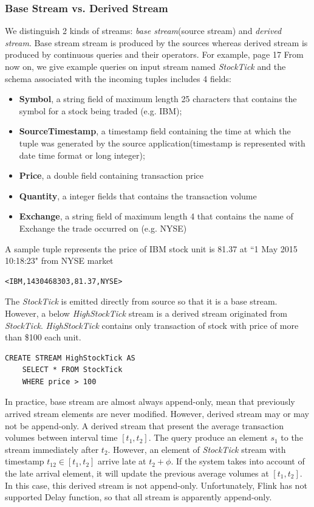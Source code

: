 \subsubsection*{Base Stream vs. Derived Stream}
We distinguish 2 kinds of streams: \textit{base stream}(source stream) and \textit{derived stream}. Base stream stream is produced by the sources whereas derived stream is produced by continuous queries and their operators\citep{Arasu:2006}. For example, \citep{Golab:2010} page 17
From now on, we give example queries on input stream named \textit{StockTick}\citep{StreamBaseTut} and the schema associated with the incoming tuples includes 4 fields:
\begin{itemize}
\item \textbf{Symbol}, a string field of maximum length 25 characters that contains the symbol for a stock being traded (e.g. IBM);
\item \textbf{SourceTimestamp}, a timestamp field containing the time at which the tuple was generated by the source application(timestamp is represented with date time format or long integer);
\item \textbf{Price}, a double field containing transaction price
\item \textbf{Quantity}, a integer fields that contains the transaction volume
\item \textbf{Exchange}, a string field of maximum length 4 that contains the name of Exchange the trade occurred on (e.g. NYSE)

\end{itemize}
A sample tuple represents the price of IBM stock unit is 81.37 at ``1 May 2015 10:18:23" from NYSE market 
\begin{verbatim}
<IBM,1430468303,81.37,NYSE>
\end{verbatim}

The \textit{StockTick} is emitted directly from source so that it is a base stream. However, a below \textit{HighStockTick} stream is a derived stream originated from \textit{StockTick}. \textit{HighStockTick} contains only transaction of stock with price of more than \$100 each unit.

\begin{verbatim}
CREATE STREAM HighStockTick AS
	SELECT * FROM StockTick 
	WHERE price > 100
\end{verbatim}

In practice, base stream are almost always append-only, mean that previously arrived stream elements are never modified. However, derived stream may or may not be append-only\cite{Golab:2010}. A derived stream that present the average transaction volumes between interval time $[t_1, t_2]$. The query produce an element $s_1$ to the stream immediately after $t_2$. However, an element of \textit{StockTick} stream with timestamp 
$t_{12} \in [t_1,t_2]$ arrive late at $t_2+\phi$. If the system takes into account of the late arrival element, it will update the previous average volumes at $[t_1, t_2]$. In this case, this derived stream is not append-only. Unfortunately, Flink has not supported Delay function, so that all stream is apparently append-only.


